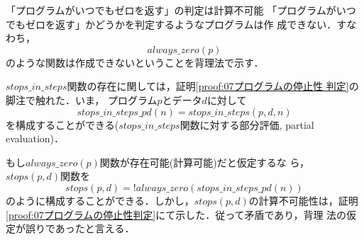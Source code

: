 \begin{myproof}{「プログラムがいつでもゼロを返す」の判定は計算不可能}
「プログラムがいつでもゼロを返す」かどうかを判定するようなプログラムは作
 成できない．すなわち，
\[
always\_zero(p)
\]
のような関数は作成できないということを背理法で示す．

$stops\_in\_steps$関数の存在に関しては，証明\ref{proof:07プログラムの停止性
 判定}の脚注で触れた．いま，
プログラム$p$とデータ$d$に対して
\[
stops\_in\_steps\_pd (n) = stops\_in\_steps(p,d,n) 
\]
を構成することができる($stops\_in\_steps$関数に対する部分評価, partial evaluation)\footnotemark．

もし$always\_zero(p)$関数が存在可能(計算可能)だと仮定するな
 ら，$stops(p,d)$関数を
\[
stops(p, d) = !always\_zero(stops\_in\_steps\_pd (n))
\]
のように構成することができる．しかし，$stops(p,d)$の計算不可能性は，証明
 \ref{proof:07プログラムの停止性判定}にて示した．従って矛盾であり，背理
 法の仮定が誤りであったと言える．
\end{myproof}
